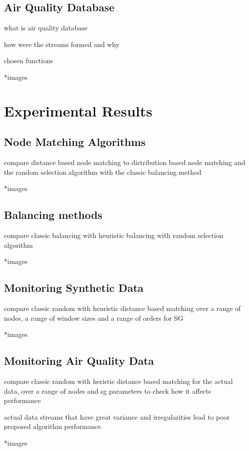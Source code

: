\subsection{Air Quality Database}

what is air quality database

how were the streams formed and why

chosen functions

*images

\section{Experimental Results} \label{sec:exp}

\subsection{Node Matching Algorithms}

compare distance based node matching to distribution based node matching and the random selection algorithm with the classic balancing method

*images

\subsection{Balancing methods}

compare classic balancing with heuristic balancing with random selection algorithm

*images

\subsection{Monitoring Synthetic Data}

compare classic random with heuristic distance based matching over a range of nodes, a range of window sizes and a range of orders for SG

*images

\subsection{Monitoring Air Quality Data}

compare classic random with heristic distance based matching for the actual data, over a range of nodes and sg parameters to check how it affects performance

actual data streams that have great variance and irregularities lead to poor proposed algorithm performance

*images

